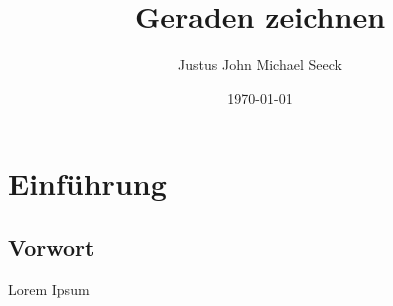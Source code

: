 \documentclass{article}
\title{Geraden zeichnen}
\author{Justus John Michael Seeck}
\date{\today}
\begin{document}
    \maketitle

    \tableofcontents

    \newpage

    \section{Einführung}

    \subsection{Vorwort}

    Lorem Ipsum
\end{document}
